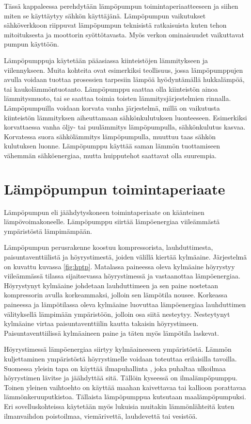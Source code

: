Tässä kappaleessa perehdytään lämpöpumpun toimintaperiaatteeseen ja siihen miten se käyttäytyy sähkön käyttäjänä. Lämpöpumpun vaikutukset sähköverkkoon riippuvat lämpöpumpun teknisistä ratkaisuista kuten tehon mitoituksesta ja moottorin syöttötavasta. Myös verkon ominaisuudet vaikuttavat pumpun käyttöön.

Lämpöpumppuja käytetään pääasiassa kiinteistöjen lämmitykseen ja viilennykseen. Muita kohteita ovat esimerkiksi teollisuus, jossa lämpöpumppujen avulla voidaan tuottaa prosessien tarpesiin lämpöä hyödyntämällä hukkalämpöä, tai kaukolämmöntuotanto.\parencite{Setala, katriVala} Lämpöpumppu saattaa olla kiinteistön ainoa lämmitysmuoto, tai se saattaa toimia toisten lämmitysjärjestelmien rinnalla. Lämpöpumpuilla voidaan korvata vanha järjestelmä, millä on vaikutusta kiinteistön lämmityksen aiheuttamaan sähkönkulutuksen luonteeseen. Esimerkiksi korvattaessa vanha öljy- tai puulämmitys lämpöpumpulla, sähkönkulutus kasvaa. Korvatessa suora sähkölämmitys lämpöpumpulla, muuttuu taas sähkön kulutuksen luonne. Lämpöpumppu käyttää saman lämmön tuottamiseen vähemmän sähköenergiaa, mutta huipputehot saattavat olla suurempia.

\section{Lämpöpumpun toimintaperiaate}
  Lämpöpumpun eli jäähdytyskoneen toimintaperiaate on käänteinen lämpövoimakoneelle. Lämpöpumppu siirtää lämpöenergiaa viileämmästä ympäristöstä lämpimämpään.\parencite{DincerRosen}

  Lämpöpumpun perusrakenne koostuu kompressorista, lauhduttimesta, paisuntaventtiilistä ja höyrystimestä, joiden välillä kiertää kylmäaine. Järjestelmä on kuvattu kuvassa \ref{fig:hptp}. Matalassa paineessa oleva kylmäaine höyrystyy viileämmässä tilassa sijaitsevassa höyrystimessä ja vastaanottaa lämpöenergiaa. Höyrystynyt kylmäaine johdetaan lauhduttimeen ja sen paine nostetaan kompressorin avulla korkeammaksi, jolloin sen lämpötila nousee. Korkeassa paineessa ja lämpötilassa oleva kylmäaine luovuttaa lämpöenergiaa lauhduttimen välityksellä lämpimään ympäristöön, jolloin osa siitä nesteytyy. Nesteytynyt kylmäaine virtaa paisuntaventtiilin kautta takaisin höyrystimeen. Paisuntaventtiilissä kylmäaineen paine ja täten myös lämpötila laskevat.\parencite{DincerRosen}

  Höyrystimessä lämpöenergiaa siirtyy kylmäaineeseen ympäristöstä. Lämmön kuljettaminen ympäristöstä höyrystimelle voidaan toteuttaa erilaisilla tavoilla. Suomessa yleisin tapa on käyttää ilmapuhallinta \parencite{sulpu}, joka puhaltaa ulkoilmaa höyrystimen lävitse ja jäähdyttää sitä. Tällöin kyseessä on ilmalämpöpumppu. Toinen yleinen vaihtoehto on käyttää maahan kaivettavaa tai kallioon porattavaa lämmönkeruuputkistoa. Tällaista lämpöpumppua kutsutaan maalämpöpumpuksi. Eri sovelluskohteissa käytetään myös lukuisia muitakin lämmönlähteitä kuten ilmanvaihdon poistoilmaa, viemärivettä, lauhdevettä tai vesistöä.\parencite{DincerRosen}

